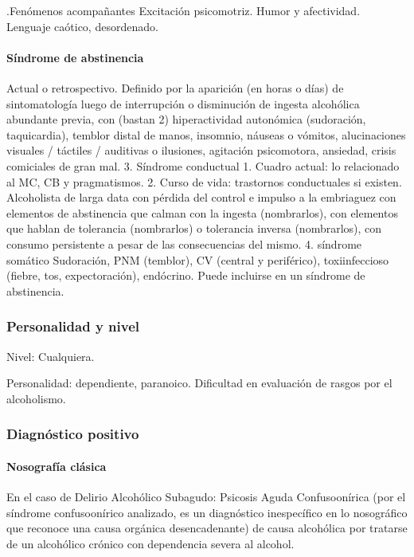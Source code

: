 \documentclass[encares.tex]{subfiles}
\begin{document}
.Fenómenos acompañantes
Excitación psicomotriz. Humor y afectividad. Lenguaje caótico, desordenado.

\paragraph{Síndrome de abstinencia}

Actual o retrospectivo. Definido por la aparición (en horas o días) de sintomatología luego de interrupción o disminución de ingesta alcohólica abundante previa, con (bastan 2) hiperactividad autonómica (sudoración, taquicardia), temblor distal de manos, insomnio, náuseas o vómitos, alucinaciones visuales / táctiles / auditivas o ilusiones, agitación psicomotora, ansiedad, crisis comiciales de gran mal. 3. Síndrome conductual 1. Cuadro actual: lo relacionado al MC, CB y pragmatismos. 2. Curso de vida: trastornos conductuales si existen. Alcoholista de larga data con pérdida del control e impulso a la embriaguez con elementos de abstinencia que calman con la ingesta (nombrarlos), con elementos que hablan de tolerancia (nombrarlos) o tolerancia inversa (nombrarlos), con consumo persistente a pesar de las consecuencias del mismo. 4. síndrome somático Sudoración, PNM (temblor), CV (central y periférico), toxiinfeccioso (fiebre, tos, expectoración), endócrino. Puede incluirse en un síndrome de abstinencia.

\subsubsection*{Personalidad y nivel}
Nivel: Cualquiera.

Personalidad: dependiente, paranoico. Dificultad en evaluación de rasgos por el alcoholismo.
\subsubsection*{Diagnóstico positivo}
\paragraph{Nosografía clásica}
En el caso de Delirio Alcohólico Subagudo: Psicosis \faArrowRight Aguda \faArrowRight Confuso\-onírica (por el síndrome confuso\-onírico analizado, es un diagnóstico inespecífico en lo nosográfico que reconoce una causa orgánica desencadenante) \faArrowRight de causa alcohólica por tratarse de un alcohólico crónico con dependencia severa al alcohol.
\end{document}
